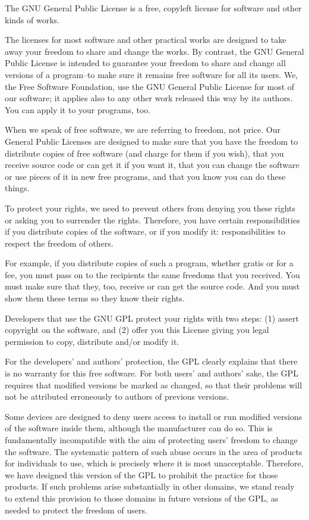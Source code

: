 \documentclass[12pt,a4paper]{book}
\begin{document}
The GNU General Public License is a free, copyleft license for
software and other kinds of works.

The licenses for most software and other practical works are designed
to take away your freedom to share and change the works.  By contrast,
the GNU General Public License is intended to guarantee your freedom to
share and change all versions of a program--to make sure it remains free
software for all its users.  We, the Free Software Foundation, use the
GNU General Public License for most of our software; it applies also to
any other work released this way by its authors.  You can apply it to
your programs, too.

When we speak of free software, we are referring to freedom, not
price.  Our General Public Licenses are designed to make sure that you
have the freedom to distribute copies of free software (and charge for
them if you wish), that you receive source code or can get it if you
want it, that you can change the software or use pieces of it in new
free programs, and that you know you can do these things.

To protect your rights, we need to prevent others from denying you
these rights or asking you to surrender the rights.  Therefore, you have
certain responsibilities if you distribute copies of the software, or if
you modify it: responsibilities to respect the freedom of others.

For example, if you distribute copies of such a program, whether
gratis or for a fee, you must pass on to the recipients the same
freedoms that you received.  You must make sure that they, too, receive
or can get the source code.  And you must show them these terms so they
know their rights.

Developers that use the GNU GPL protect your rights with two steps:
(1) assert copyright on the software, and (2) offer you this License
giving you legal permission to copy, distribute and/or modify it.

For the developers' and authors' protection, the GPL clearly explains
that there is no warranty for this free software.  For both users' and
authors' sake, the GPL requires that modified versions be marked as
changed, so that their problems will not be attributed erroneously to
authors of previous versions.

Some devices are designed to deny users access to install or run
modified versions of the software inside them, although the manufacturer
can do so.  This is fundamentally incompatible with the aim of
protecting users' freedom to change the software.  The systematic
pattern of such abuse occurs in the area of products for individuals to
use, which is precisely where it is most unacceptable.  Therefore, we
have designed this version of the GPL to prohibit the practice for those
products.  If such problems arise substantially in other domains, we
stand ready to extend this provision to those domains in future versions
of the GPL, as needed to protect the freedom of users.
\end{document}
